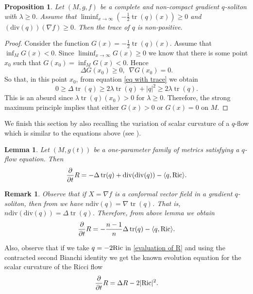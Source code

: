 \documentclass{amsart}
\theoremstyle{plain}
\newtheorem{lemma}[theorem]{\bf Lemma}
\newtheorem{proposition}[theorem]{\bf Proposition}
\newtheorem{remark}[theorem]{Remark}
\numberwithin{equation}{section}
\begin{document}
\begin{proposition}
 Let $(M, g, f)$ be a complete and non-compact gradient $q$-soliton with $\lambda\geq0$. Assume that $\liminf_{x\to\infty}(-\frac{1}{2}\operatorname{tr}(q)(x))\geq0$ and $(\mathrm{div}(q))(\nabla f) \geq0$. Then the trace of $q$ is non-positive.
\end{proposition}
\begin{proof}
    Consider the function $G(x)=-\frac{1}{2}\operatorname{tr}(q)(x)$. Assume that $\inf_M G(x)<0$. Since $\liminf_{x\to\infty}G(x)\geq0$ we know that there is some point $x_0$ such that $G(x_0)=\inf_MG(x)<0$. Hence 
    $$\Delta G(x_0)\geq0,\,\,\,\nabla G(x_0)=0.$$
  So that, in this point $x_0$, from equation \eqref{eq with trace} we obtain
  $$0\geq\Delta\operatorname{tr}(q)\geq 2\lambda\operatorname{tr}(q)+|q|^2\geq2\lambda\operatorname{tr}(q).$$
  This is an absurd since $\lambda\operatorname{tr}(q)(x_0)>0$ for $\lambda\geq0$. Therefore, the strong maximum principle implies that either $G(x)>0$ or $G(x)=0$ on $M$.
\end{proof}

We finish this section by also  recalling the variation of scalar curvature of a $q$-flow which is similar to the equations above (see \cite[Lemma 2.8]{B Chow}).
\begin{lemma}
Let $(M,g(t))$ be a one-parameter
family of metrics satisfying a $q$-flow equation. Then
\begin{equation}\label{evaluation of R}
    \frac{\partial}{\partial t}R=-\Delta \operatorname{tr}(q)+\mathrm{div}(\mathrm{div}(q))-\langle q, {\rm Ric}\rangle.
\end{equation}
\end{lemma}
\begin{remark}
{\em 
   Observe that if $X=\nabla f$ is a conformal vector field in a gradient $q$-soliton, then from \cite{Cunha and Griffin} we have $n \mathrm{div}(q)=\nabla \operatorname{tr}(q)$. That is, $n \mathrm{div}(\mathrm{div}(q))=\Delta\operatorname{tr}(q)$. Therefore, from above lemma we obtain
$$\frac{\partial}{\partial t}R=-\frac{n-1}{n}\Delta \operatorname{tr}(q)-\langle q, {\rm Ric}\rangle.$$ }
\end{remark}


Also, observe that if we take $q=-2{\rm Ric}$ in \eqref{evaluation of R} and using the contracted second Bianchi
identity we get the known evolution equation for the scalar curvature of the Ricci flow
$$\frac{\partial}{\partial t}R=\Delta R-2|{\rm Ric}|^2.$$
\end{document}
